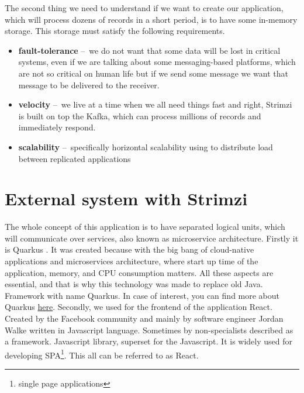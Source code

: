 \documentclass{ExcelAtFIT}
\begin{document}
The second thing we need to understand if we want to create our application, which will process dozens of records in a short period, is to have some in-memory storage. This storage must satisfy the following requirements. \begin{itemize} 
  \item \textbf{fault-tolerance} \---\ we do not want that some data will be lost in critical systems, even if we are talking about some messaging-based platforms, which are not so critical on human life but if we send some message we want that message to be delivered to the receiver.
  \item \textbf{velocity} \---\ we live at a time when we all need things fast and right, Strimzi is built on top the Kafka, which can process millions of records and immediately respond.
  \item \textbf{scalability} \---\ specifically horizontal scalability using to distribute load between replicated applications
\end{itemize}



\section{External system with Strimzi}
\label{sec:externalSystem}

The whole concept of this application is to have separated logical units, which will communicate over services, also known as microservice architecture. Firstly it is Quarkus \cite{Quarkus}. It was created because with the big bang of cloud-native applications and microservices architecture, where start up time of the application, memory, and CPU consumption matters. All these aspects are essential, and that is why this technology was made to replace old Java. Framework with name Quarkus. In case of interest, you can find more about Quarkus \href{https://quarkus.io/}{here}. Secondly, we used for the frontend of the application React.  Created by the Facebook community and mainly by software engineer Jordan Walke written in Javascript language. Sometimes by non-specialists described as a framework. Javascript library, superset for the Javascript. It is widely used for developing SPA\footnote{single page applications}. This all can be referred to as React.
\end{document}
